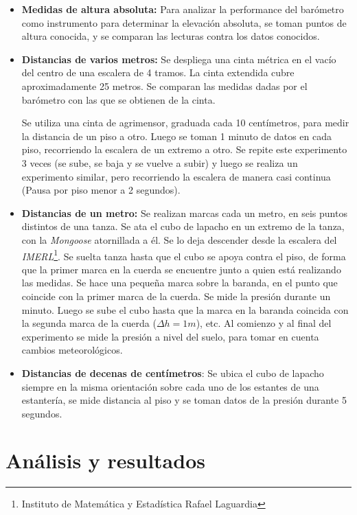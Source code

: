 \documentclass[main]{subfiles}
\begin{document}
\begin{itemize}
\item \textbf{Medidas de altura absoluta:} Para analizar la performance del bar\'ometro como instrumento para determinar la elevaci\'on absoluta, se toman puntos de altura conocida, y se comparan las lecturas contra los datos conocidos.

\item \textbf{Distancias de varios metros:} Se despliega una cinta m\'etrica en el vac\'io del centro de una escalera de 4 tramos. La cinta extendida cubre aproximadamente 25 metros. Se comparan las medidas dadas por el bar\'ometro con las que se obtienen de la cinta.

Se utiliza una cinta de agrimensor, graduada cada 10 cent\'imetros, para medir la distancia de un piso a otro. Luego se toman 1 minuto de datos en cada piso, recorriendo la escalera de un extremo a otro. Se repite este experimento 3 veces (se sube, se baja y se vuelve a subir) y luego se realiza un experimento similar, pero recorriendo la escalera de manera casi continua (Pausa por piso menor a 2 segundos).

\item \textbf{Distancias de un metro:} Se realizan marcas cada un metro, en seis puntos distintos de una tanza. Se ata el cubo de lapacho en un extremo de la tanza, con la \emph{Mongoose} atornillada a \'el. Se lo deja descender desde la escalera del \emph{IMERL}\footnote{Instituto de Matem\'atica y Estad\'istica Rafael Laguardia}. Se suelta tanza hasta que el cubo se apoya contra el piso, de forma que la primer marca en la cuerda se encuentre junto a quien est\'a realizando las medidas. Se hace una peque\~na marca sobre la baranda, en el punto que coincide con la primer marca de la cuerda. Se mide la presi\'on durante un minuto. Luego se sube el cubo hasta que la marca en la baranda coincida con la segunda marca de la cuerda ($\Delta h = 1m$), etc.
Al comienzo y al final del experimento se mide la presi\'on a nivel del suelo, para tomar en cuenta cambios meteorol\'ogicos.

\item \textbf{Distancias de decenas de cent\'imetros}: Se ubica el cubo de lapacho siempre en la misma orientaci\'on sobre cada uno de los estantes de una estanter\'ia, se mide distancia al piso y se toman datos de la presi\'on durante 5 segundos.

\end{itemize}

\section{An\'alisis y resultados}
\end{document}
